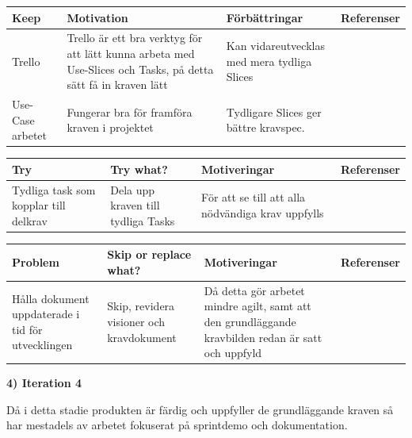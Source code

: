 \documentclass[conference,a4paper]{IEEEtran}
\newcommand\Tstrut{\rule{0pt}{2.6ex}}       %
\newcommand\Bstrut{\rule[-0.9ex]{0pt}{0pt}} %
\newcommand{\TBstrut}{\Tstrut\Bstrut} %
\begin{document}
\begin{table}[H]
	\small
  \centering
	\begin{tabular}{|p{1.5cm}|p{2cm}|p{1.8cm}|p{1.5cm}|} %
    \hline
    Keep & Motivation & Förbättringar & Referenser \TBstrut \\
    \hline
     Trello & Trello är ett bra verktyg för att lätt kunna arbeta med Use-Slices och Tasks, på detta sätt få in kraven lätt & Kan vidareutvecklas med mera tydliga Slices & \cite{Jacobson11} \TBstrut \\
    \hline
    Use-Case arbetet & Fungerar bra för framföra kraven i projektet & Tydligare Slices ger bättre kravspec. &\cite{Jacobson11} \TBstrut \\
    \hline
  \end{tabular}
\end{table}

\begin{table}[H]
	\small
  \centering
	\begin{tabular}{|p{1.5cm}|p{2cm}|p{1.8cm}|p{1.5cm}|} %
    \hline
    Try & Try what? & Motiveringar & Referenser \TBstrut \\
    \hline
     Tydliga task som kopplar till delkrav & Dela upp kraven till tydliga Tasks & För att se till att alla nödvändiga krav uppfylls & \TBstrut \\
    \hline
  \end{tabular}
\end{table}

\begin{table}[H]
	\small
  \centering
	\begin{tabular}{|p{1.5cm}|p{2cm}|p{1.8cm}|p{1.5cm}|} %
    \hline
    Problem & Skip or replace what? & Motiveringar & Referenser \TBstrut \\
    \hline
    Hålla dokument uppdaterade i tid för utvecklingen & Skip, revidera visioner och kravdokument & Då detta gör arbetet mindre agilt, samt att den grundläggande kravbilden redan är satt och uppfyld  &  \TBstrut \\
    \hline

  \end{tabular}
\end{table}

\textbf{4) Iteration 4}

Då i detta stadie produkten är färdig och uppfyller de grundläggande kraven så har mestadels av arbetet fokuserat på sprintdemo och dokumentation.
\end{document}
